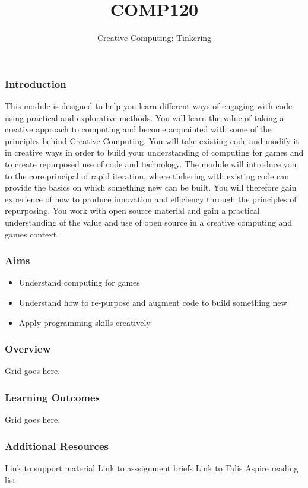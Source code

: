 \documentclass[handout, xcolor={dvipsnames}]{beamer}\usepackage{etoolbox}\newtoggle{printable}\toggletrue{printable}
\begin{document}
\title{COMP120}
\subtitle{Creative Computing: Tinkering }

\frame{\titlepage} 

\begin{frame}
	\frametitle{Introduction}
This module is designed to help you learn different ways of engaging with code using practical and explorative methods. You will learn the value of taking a creative approach to computing and become acquainted with some of the principles behind Creative Computing. You will take existing code and modify it in creative ways in order to build your understanding of computing for games and to create repurposed use of code and technology. The module will introduce you to the core principal of rapid iteration, where tinkering with existing code can provide the basics on which something new can be built. You will therefore gain experience of how to produce innovation and efficiency through the principles of repurposing. You work with open source material and gain a practical understanding of the value and use of open source in a creative computing and games context. 
	
\end{frame}

\begin{frame}
	\frametitle{Aims}
	\begin{itemize}
		\item Understand computing for games
		\item Understand how to re-purpose and augment code to build something new
		\item Apply programming skills creatively
	\end{itemize}
\end{frame}

\begin{frame}
	\frametitle{Overview}
	
	Grid goes here.
\end{frame}

\begin{frame}
	\frametitle{Learning Outcomes}
	
	Grid goes here.
\end{frame}

\begin{frame}
	\frametitle{Additional Resources}
	
	Link to support material
	Link to asssignment briefs
	Link to Talis Aspire reading list
\end{frame}
\end{document}
